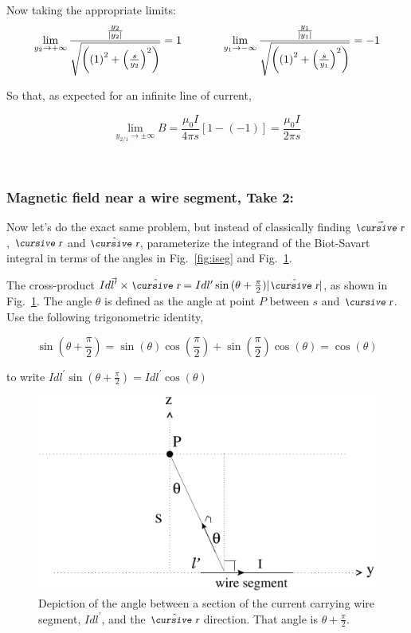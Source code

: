 \documentclass[12pt]{article}
\begin{document}
\begin{flushleft}
Now taking the appropriate limits:
\[
\lim_{y_{2} \to +\infty}  \frac{ \frac{y_{2}}{|y_{2}|} }{\sqrt{\left( \left( 1 \right)^{2}+\left( \frac{s}{y_{2}} \right)^{2} \right)}} = 1
\hspace{.5in}
\lim_{y_{1} \to -\infty}  \frac{ \frac{y_{1}}{|y_{1}|} }{\sqrt{\left( \left( 1 \right)^{2}+\left( \frac{s}{y_{1}} \right)^{2} \right)}} = -1
\]

So that, as expected for an infinite line of current,

\begin{equation*}
 \lim_{y_{2/1} \to \pm\infty}  B = \frac{ \mu_{0} I}{4\pi s} \left[ 1 - (-1) \right] = \frac{ \mu_{0} I}{2\pi s}  
\end{equation*}

\vspace{.2in}
{\color{mygreen} \hrulefill}\\
\vspace{-.1in}
\subsubsection*{\bf Magnetic field near a wire segment, Take 2:}

Now let's do the exact same problem, but instead of classically finding $\vec{\text{\small\slshape\cursive r}}$, $\text{\small\slshape\cursive r}$ and $\hat{\text{\small\slshape\cursive r}}$, parameterize the integrand of the Biot-Savart integral in terms of the angles in Fig.~\ref{fig:iseg} and Fig.~\ref{fig:angles}.

The cross-product $Id\vec{l}^{\prime} \times \hat{\text{\small\slshape\cursive r}} = Idl^{\prime} \sin{(\theta+\frac{\pi}{2})}|\hat{\text{\small\slshape\cursive r}}|$, as shown in Fig.~\ref{fig:angles}.  The angle $\theta$ is defined as the angle at point $P$ between $s$ and $\text{\small\slshape\cursive r}$.  Use the following trigonometric identity,

\[
\sin{(\theta+\frac{\pi}{2})}=\sin{(\theta)}\cos{(\frac{\pi}{2})}+\sin{(\frac{\pi}{2})}\cos{(\theta)} = \cos{(\theta)}
\]

to write $Idl^{\prime} \sin{(\theta+\frac{\pi}{2})}=Idl^{\prime} \cos{(\theta)}$

\begin{figure}[h]
\centering 
\includegraphics*[width=.6\columnwidth]{angles.pdf} 
\caption{Depiction of the angle between a section of the current carrying wire segment, $Idl^{\prime}$, and the $\hat{\text{\small\slshape\cursive r}}$ direction.  That angle is $\theta + \frac{\pi}{2}$.}
\label{fig:angles}
\end{figure}


\end{flushleft}
\end{document}
